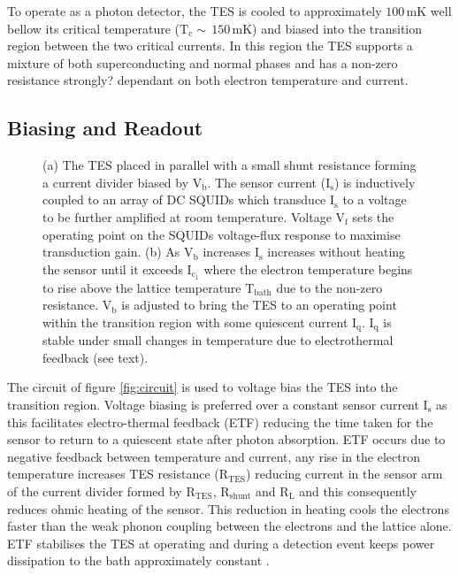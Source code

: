 \documentclass{article}
\begin{document}
\newpage

To operate as a photon detector, the TES is cooled to approximately
$100\,\mathrm{mK}$ well bellow its critical temperature 
($\mathrm{T}_\mathrm{c}\sim\,150\,\mathrm{mK}$) and biased into the transition
region between the two critical currents.
In this region the TES supports a mixture of both superconducting and normal
phases and has a non-zero resistance strongly? dependant on both electron
temperature and current.

\subsection{Biasing and Readout}

\begin{figure}[!hpbt]
  \caption{
    (a) The TES placed in parallel with a small shunt resistance forming a
    current divider biased by $\mathrm{V}_\mathrm{b}$. The sensor
    current ($\mathrm{I}_\mathrm{s}$) is inductively coupled to an array of DC
    SQUIDs which transduce $\mathrm{I}_\mathrm{s}$ to a voltage to be further
    amplified at room temperature. Voltage $\mathrm{V}_\mathrm{f}$ sets the
    operating point on the SQUIDs voltage-flux response to maximise transduction
    gain.
    (b) As $\mathrm{V}_\mathrm{b}$ increases $\mathrm{I}_\mathrm{s}$
    increases without heating the sensor until it
    exceeds $\mathrm{I}_{\mathrm{c}_1}$ where the electron temperature 
    begins to rise above the lattice temperature $\mathrm{T}_\mathrm{bath}$
    due to the non-zero resistance. $\mathrm{V}_\mathrm{b}$ is adjusted to bring
    the TES to an operating point within the transition region with some
    quiescent current $\mathrm{I}_\mathrm{q}$. $\mathrm{I}_\mathrm{q}$ is stable
    under small changes in temperature due to electrothermal feedback (see
    text).
  }
\end{figure}

The circuit of figure \ref{fig:circuit} is used to voltage bias the TES into the
transition region. 
Voltage biasing is preferred over a constant sensor current
$\mathrm{I}_\mathrm{s}$ as this facilitates electro-thermal feedback (ETF)
reducing the time taken for the sensor to return to a quiescent state after
photon absorption. 
ETF occurs due to negative feedback between temperature and current, any rise
in the electron temperature increases TES resistance
($\mathrm{R}_\mathrm{TES}$) reducing current in the sensor arm of the current
divider formed by $\mathrm{R}_\mathrm{TES}$, $\mathrm{R}_\mathrm{shunt}$ and
$\mathrm{R}_\mathrm{L}$ and this consequently reduces ohmic heating of the
sensor.
This reduction in heating cools the electrons faster than the weak phonon
coupling between the electrons and the lattice alone.
ETF stabilises the TES at operating and during a detection event keeps
power dissipation to the bath approximately constant \cite{SaeWooNam:1999hz}.
\end{document}
